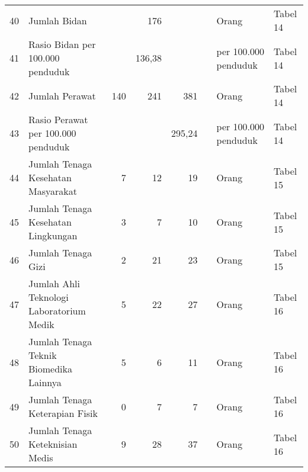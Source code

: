 \begin{small}
\begin{longtable}{rY{12em}rrrrY{5em}Y{5em}}
	 40 & Jumlah Bidan                                                                          &        &    176 &         &                   & Orang                          & Tabel 14 \\
	                   41 & Rasio Bidan per 100.000 penduduk                                                      &        & 136,38 &         &                   & per 100.000 penduduk           & Tabel 14 \\
	 42 & Jumlah Perawat                                                                        &    140 &    241 &     381 &                   & Orang                          & Tabel 14 \\
	                   43 & Rasio Perawat per 100.000 penduduk                                                    &        &        &  295,24 &                   & per 100.000 penduduk           & Tabel 14 \\
	 44 & Jumlah Tenaga Kesehatan Masyarakat                                                    &      7 &     12 &      19 &                   & Orang                          & Tabel 15 \\
	                   45 & Jumlah Tenaga Kesehatan Lingkungan                                                    &      3 &      7 &      10 &                   & Orang                          & Tabel 15 \\
	 46 & Jumlah Tenaga Gizi                                                                    &      2 &     21 &      23 &                   & Orang                          & Tabel 15 \\
	                   47 & Jumlah Ahli Teknologi Laboratorium Medik                                              &      5 &     22 &      27 &                   & Orang                          & Tabel 16 \\
	 48 & Jumlah Tenaga Teknik Biomedika Lainnya                                                &      5 &      6 &      11 &                   & Orang                          & Tabel 16 \\
	                   49 & Jumlah Tenaga Keterapian Fisik                                                        &      0 &      7 &       7 &                   & Orang                          & Tabel 16 \\
	 50 & Jumlah Tenaga Keteknisian Medis                                                       &      9 &     28 &      37 &                   & Orang                          & Tabel 16 \\

\end{longtable}
\end{small}
